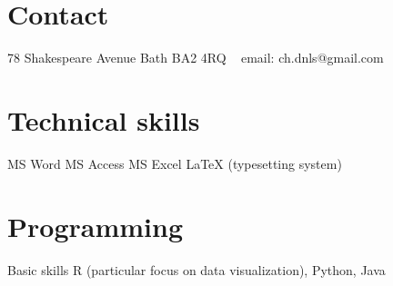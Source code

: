 \documentclass[print, oneside]{friggeri-cv} %
\begin{document}

\begin{aside} %
\section{Contact}
78 Shakespeare Avenue
Bath
BA2 4RQ
~
email: ch.dnls@gmail.com
\section{Technical skills}
MS Word
MS Access
MS Excel
LaTeX (typesetting system)
\section{Programming}
Basic skills
R (particular focus on data visualization), Python, Java
\end{aside}

\end{document}
